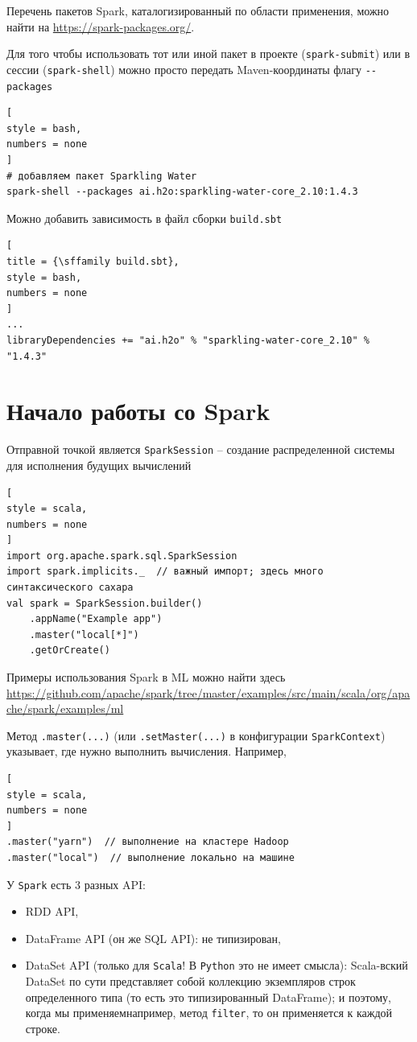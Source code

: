 \documentclass[%
	11pt,
	a4paper,
	utf8,
		]{article}
\begin{document}
Перечень пакетов Spark, каталогизированный по области применения, можно найти на \url{https://spark-packages.org/}.

Для того чтобы использовать тот или иной пакет в проекте (\verb|spark-submit|) или в сессии (\verb|spark-shell|) можно просто передать  Maven-координаты флагу \verb|--packages|
\begin{lstlisting}[
style = bash,
numbers = none	
]
# добавляем пакет Sparkling Water
spark-shell --packages ai.h2o:sparkling-water-core_2.10:1.4.3
\end{lstlisting}

Можно добавить зависимость в файл сборки \texttt{build.sbt}
\begin{lstlisting}[
title = {\sffamily build.sbt},
style = bash,
numbers = none	
]
...
libraryDependencies += "ai.h2o" % "sparkling-water-core_2.10" % "1.4.3"
\end{lstlisting}



\section{Начало работы со Spark}

Отправной точкой является \texttt{SparkSession} -- создание распределенной системы для исполнения будущих вычислений
\begin{lstlisting}[
style = scala,
numbers = none	
]
import org.apache.spark.sql.SparkSession
import spark.implicits._  // важный импорт; здесь много синтаксического сахара
val spark = SparkSession.builder()
    .appName("Example app")
    .master("local[*]")
    .getOrCreate()
\end{lstlisting}

Примеры использования Spark в ML можно найти здесь \url{https://github.com/apache/spark/tree/master/examples/src/main/scala/org/apache/spark/examples/ml}

Метод \texttt{.master(...)} (или \texttt{.setMaster(...)} в конфигурации \texttt{SparkContext}) указывает, где нужно выполнить вычисления. Например,
\begin{lstlisting}[
style = scala,
numbers = none
]
.master("yarn")  // выполнение на кластере Hadoop
.master("local")  // выполнение локально на машине
\end{lstlisting}

У \texttt{Spark} есть 3 разных API:
\begin{itemize}
	\item RDD API,
	
	\item DataFrame API (он же SQL API): не типизирован,
	
	\item DataSet API (только для \texttt{Scala}! В \texttt{Python} это не имеет смысла): Scala-вский DataSet по сути представляет собой коллекцию экземпляров строк определенного типа (то есть это типизированный DataFrame); и поэтому, когда мы применяемнапример, метод \texttt{filter}, то он применяется к каждой строке.
\end{itemize}
\end{document}
